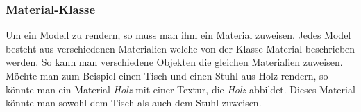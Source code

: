 \subsubsection{Material-Klasse}
Um ein Modell zu rendern, so muss man ihm ein Material zuweisen. Jedes Model besteht aus verschiedenen Materialien welche von der Klasse Material beschrieben werden.
So kann man verschiedene Objekten die gleichen Materialien zuweisen. Möchte man zum Beispiel einen Tisch und einen Stuhl aus Holz rendern, so könnte man ein Material \textit{Holz} mit einer Textur, die \textit{Holz} abbildet. Dieses Material könnte man sowohl dem Tisch als auch dem Stuhl zuweisen.




